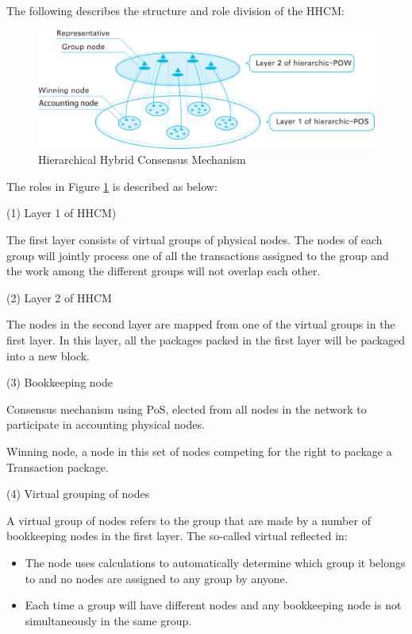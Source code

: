 \documentclass[a4paper,12pt]{article}
\begin{document}
The following describes the structure and role division of the HHCM:

\begin{figure} [htbp]
\centering \includegraphics [width = 5in]{pic/HHCA.png}
\caption{Hierarchical Hybrid Consensus Mechanism} \label{fig: HHCM}
\end{figure}

The roles in Figure \ref{fig: HHCM} is described as below:

(1) Layer 1 of HHCM)

The first layer consists of virtual groups of physical nodes. The nodes of each group will jointly process one of all the transactions assigned to the group and the work among the different groups will not overlap each other.

(2) Layer 2 of HHCM

The nodes in the second layer are mapped from one of the virtual groups in the first layer. In this layer, all the packages packed in the first layer will be packaged into a new block.

(3) Bookkeeping node

Consensus mechanism using PoS, elected from all nodes in the network to participate in accounting physical nodes.

Winning node, a node in this set of nodes competing for the right to package a Transaction package.

(4) Virtual grouping of nodes

A virtual group of nodes refers to the group that are made by a number of bookkeeping nodes in the first layer. The so-called virtual reflected in:

\begin{itemize} [itemindent = 1em]
\item The node uses calculations to automatically determine which group it belongs to and no nodes are assigned to any group by anyone.
\item Each time a group will have different nodes and any bookkeeping node is not simultaneously in the same group.
\end{itemize}
\end{document}
